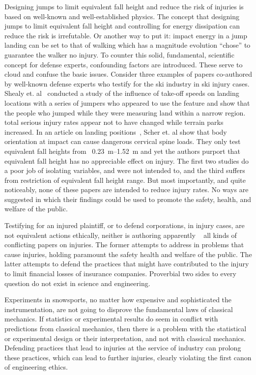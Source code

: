 \documentclass{article}
\begin{document}
Designing jumps to limit equivalent fall height and reduce the risk of injuries
is based on well-known and well-established physics. The concept that
designing jumps to limit equivalent fall height and controlling for energy
dissipation can reduce the risk is irrefutable. Or another way to put it:
impact energy in a jump landing can be set to that of walking which has a
magnitude evolution ``chose'' to guarantee the walker no injury. To counter this solid, fundamental, scientific concept for defense
experts, confounding factors are introduced. These serve to cloud and confuse
the basic issues. Consider three examples of papers co-authored by well-known
defense experts who testify for the ski industry in ski injury cases.
Shealy et. al~\cite{Shealy2010} conducted a study of the influence of take-off speeds on
landing locations with a series of jumpers who appeared to use the feature and
show that the people who jumped while they were measuring land within a narrow
region.  \cite{Shealy2015} total serious injury rates appear not to have
changed while terrain parks increased. In an article on landing
positions~\cite{Scher2015}, Scher et. al show that body orientation at impact
can cause dangerous cervical spine loads. They only test equivalent fall
heights from ~\SIrange{0.23}{1.52}{\meter} and yet the authors purport that
equivalent fall height has no appreciable effect on injury. The first two
studies do a poor job of isolating variables, and were not intended to, and the
third suffers from restriction of equivalent fall height range. But most
importantly, and quite noticeably,
none of these papers are intended to reduce injury rates. No ways are suggested
in which their findings could be used to promote the safety, health, and
welfare of the public.

Testifying for an injured plaintiff, or to defend corporations, in injury
cases, are not equivalent actions ethically, neither is authoring apparently ~
all kinds of conflicting papers on injuries. The former attempts to address in
problems that cause injuries, holding paramount the safety health and welfare
of the public. The latter attempts to defend the practices that might have
contributed to the injury to limit financial losses of insurance companies.
Proverbial two sides to every question do not exist in science and engineering.

Experiments in snowsports, no matter how expensive and sophisticated the
instrumentation, are not going to disprove the fundamental laws of classical
mechanics. If statistics or experimental results do seem in conflict with
predictions from classical mechanics, then there is a problem with the
statistical or experimental design or their interpretation, and not with
classical mechanics. Defending practices that lead to injuries at the service
of industry can prolong these practices, which can lead to further injuries,
clearly violating the first canon of engineering ethics.
\end{document}
